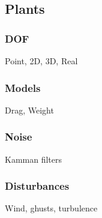 \subsection{Plants}
\subsubsection{DOF}
Point, 2D, 3D, Real
\subsubsection{Models}
Drag, Weight
\subsubsection{Noise}
Kamman filters
\subsubsection{Disturbances}
Wind, ghusts, turbulence